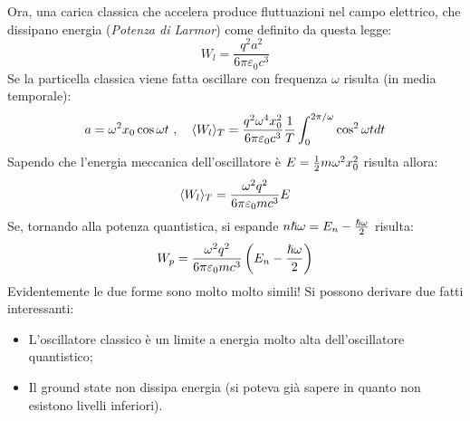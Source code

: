 Ora, una carica classica che accelera produce fluttuazioni nel campo elettrico, che dissipano energia (\textit{Potenza di Larmor}) come definito da questa legge:
\[
    W_l = \frac{q^2 a^2}{6\pi\varepsilon_0 c^3}
\]
Se la particella classica viene fatta oscillare con frequenza $\omega$ risulta (in media temporale):
\[
    a = \omega^2x_0\cos\omega t\ , \ \ \ \avg[T]{W_l} = \frac{q^2 \omega^4 x_0^2}{6\pi\varepsilon_0 c^3} \inv T \int_{0}^{2\pi/\omega}\cos^2 \omega t dt
\]
Sapendo che l'energia meccanica dell'oscillatore è $E=\half m \omega^2 x_0^2$ risulta allora:
\[
    \avg[T]{W_l} = \frac{\omega^2q^2}{6\pi\varepsilon_0mc^3}E
\]
Se, tornando alla potenza quantistica, si espande $n\h\omega = E_n - \frac{\h\omega}{2}$ risulta:
\[
    W_p = \frac{\omega^2q^2}{6\pi\varepsilon_0mc^3}\l E_n - \frac{\h\omega}{2}\r
\]
Evidentemente le due forme sono molto molto simili! Si possono derivare due fatti interessanti:
\begin{itemize}
    \item L'oscillatore classico è un limite a energia molto alta dell'oscillatore quantistico;
    \item Il ground state non dissipa energia (si poteva già sapere in quanto non esistono livelli inferiori).
\end{itemize}
